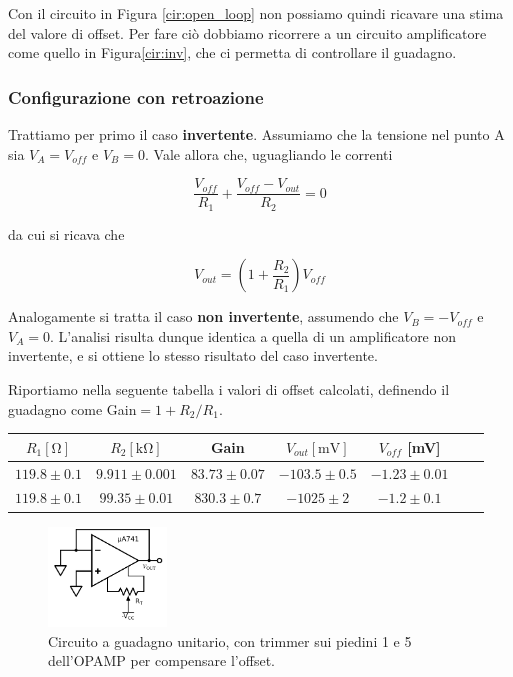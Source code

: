 Con il circuito in Figura \ref{cir:open_loop} non possiamo quindi ricavare una stima del valore di offset. Per fare ciò dobbiamo ricorrere a un circuito amplificatore come quello in Figura\ref{cir:inv}, che ci permetta di controllare il guadagno.

\subsubsection{Configurazione con retroazione}

Trattiamo per primo il caso \textbf{invertente}. Assumiamo che la tensione nel punto A sia $V_A=V_{off}$ e $V_B=0$. Vale allora che, uguagliando le correnti

$$\frac{V_{off}}{R_1} + \frac{V_{off}-V_{out}}{R_2} = 0$$

da cui si ricava che

$$V_{out}=\left(1+\frac{R_2}{R_1}\right) V_{off}$$

Analogamente si tratta il caso \textbf{non invertente}, assumendo che $V_B=-V_{off}$ e $V_A=0$. L'analisi risulta dunque identica a quella di un amplificatore non invertente, e si ottiene lo stesso risultato del caso invertente. 

Riportiamo nella seguente tabella i valori di offset calcolati, definendo il guadagno come Gain$=1+R_2/R_1$. 

\begin{center}
\begin{savenotes}
\begin{tabular}{c|c|c|c|c|c|c}
$R_1[\si{\ohm}]$ & $R_2[\si{\kilo\ohm}]$ & Gain &$V_{out} [\si{\milli\volt}]$ & $V_{off}$ [\si{\milli\volt}]\\ 
\hline 
$119.8\pm0.1$ & $9.911\pm0.001$ & $83.73\pm0.07$&  $-103.5 \pm 0.5$ & $-1.23 \pm0.01$\\
\hline
$119.8\pm0.1$ & $99.35\pm0.01$ & $830.3\pm0.7$ &$ -1025 \pm 2$ & $-1.2 \pm0.1$\\

\end{tabular}
\end{savenotes}
\end{center}

\begin{figure}
  \begin{center}
    \includegraphics[width=0.280\textwidth]{../E02/latex/trimmer_correction.pdf}
  \end{center}
  \caption{Circuito a guadagno unitario, con trimmer sui piedini 1 e 5 dell'OPAMP per compensare l'offset.}
  \label{cir2:trimmer}
\end{figure}

